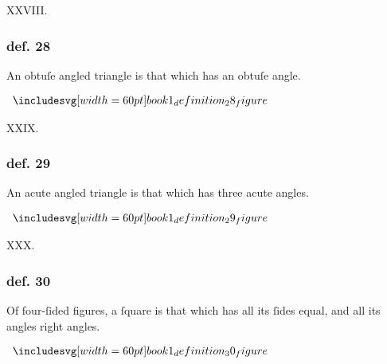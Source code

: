 \hfill

\begin{center}
  XXVIII.\label{book1def28}\\
\end{center}
\begin{minipage}{0.67\textwidth}
  \subsubsection{def. 28}
  \begin{center}
    \raggedright An obtuſe angled triangle is that which has an obtuſe angle.
  \end{center}
\end{minipage}%
\begin{minipage}{0.33\textwidth}
  \begin{center}
    $\img[0][0][60]{book1_definition_28_figure}$
  \end{center}
\end{minipage}

\hfill

\begin{center}
  XXIX.\label{book1def29}\\
\end{center}
\begin{minipage}{0.67\textwidth}
  \subsubsection{def. 29}
  \begin{center}
    \raggedright An acute angled triangle is that which has three acute angles.
  \end{center}
\end{minipage}%
\begin{minipage}{0.33\textwidth}
  \begin{center}
    $\img[0][0][60]{book1_definition_29_figure}$
  \end{center}
\end{minipage}

\hfill

\begin{center}
  XXX.\label{book1def30}\\
\end{center}
\begin{minipage}{0.67\textwidth}
  \subsubsection{def. 30}
  \begin{center}
    \raggedright Of four-ſided figures, a ſquare is that which has all its ſides equal, and all its angles right angles.
  \end{center}
\end{minipage}%
\begin{minipage}{0.33\textwidth}
  \begin{center}
    $\img[0][0][60]{book1_definition_30_figure}$
  \end{center}
\end{minipage}

